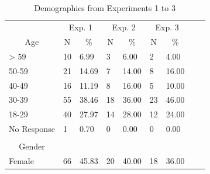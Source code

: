 \documentclass[english,,man,floatsintext]{apa6}
\begin{document}
\begin{appendix}
\section{}
\begin{table}[htbp]
\centering
\begin{threeparttable}
\caption{Demographics from Experiments 1 to 3}
\label{TR_table_4}
\begin{tabular}{llccccccc}
\toprule
& \multicolumn{2}{c}{Exp. 1} & \multicolumn{2}{c}{Exp. 2} & \multicolumn{2}{c}{Exp. 3} & \\
\cmidrule(rl){2-3}
\cmidrule(rl){4-5}
\cmidrule(rl){6-7}
\multicolumn{1}{c}{Age} & \multicolumn{1}{c}{N} & \multicolumn{1}{c}{\%} & \multicolumn{1}{c}{N} & \multicolumn{1}{c}{\%} & \multicolumn{1}{c}{N} & \multicolumn{1}{c}{\%}  \\
\midrule
\multicolumn{1}{l}{> 59} & \multicolumn{1}{l}{10} & \multicolumn{1}{l}{ 6.99} & \multicolumn{1}{l}{3} & \multicolumn{1}{l}{ 6.00} & \multicolumn{1}{l}{2} & \multicolumn{1}{l}{ 4.00} \\
\multicolumn{1}{l}{50-59} & \multicolumn{1}{l}{21} & \multicolumn{1}{l}{14.69} & \multicolumn{1}{l}{7} & \multicolumn{1}{l}{14.00} & \multicolumn{1}{l}{8} & \multicolumn{1}{l}{16.00} \\
\multicolumn{1}{l}{40-49} & \multicolumn{1}{l}{16} & \multicolumn{1}{l}{11.19} & \multicolumn{1}{l}{8} & \multicolumn{1}{l}{16.00} & \multicolumn{1}{l}{5} & \multicolumn{1}{l}{10.00} \\
\multicolumn{1}{l}{30-39} & \multicolumn{1}{l}{55} & \multicolumn{1}{l}{38.46} & \multicolumn{1}{l}{18} & \multicolumn{1}{l}{36.00} & \multicolumn{1}{l}{23} & \multicolumn{1}{l}{46.00} \\
\multicolumn{1}{l}{18-29} & \multicolumn{1}{l}{40} & \multicolumn{1}{l}{27.97} & \multicolumn{1}{l}{14} & \multicolumn{1}{l}{28.00} & \multicolumn{1}{l}{12} & \multicolumn{1}{l}{24.00} \\
\multicolumn{1}{l}{No Response} & \multicolumn{1}{l}{1} & \multicolumn{1}{l}{ 0.70} & \multicolumn{1}{l}{0} & \multicolumn{1}{l}{ 0.00} & \multicolumn{1}{l}{0} & \multicolumn{1}{l}{ 0.00} \\
& & & & & & & \\
\multicolumn{1}{c}{Gender} & & & & & & \\
\midrule
\multicolumn{1}{l}{Female} & \multicolumn{1}{l}{66} & \multicolumn{1}{l}{45.83} & \multicolumn{1}{l}{20} & \multicolumn{1}{l}{40.00} & \multicolumn{1}{l}{18} & \multicolumn{1}{l}{36.00} \\

\end{tabular}
\end{threeparttable}
\end{table}
\end{appendix}
\end{document}
